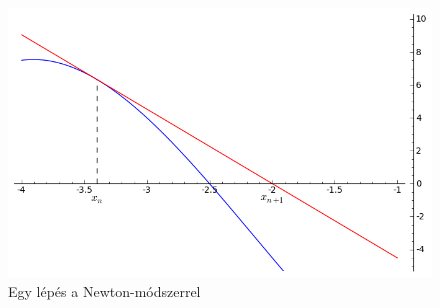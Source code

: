 \documentclass[a4paper,12pt]{report}
\begin{document}
			\begin{figure}[ht]
				\centering
				\includegraphics[scale=0.55]{kepek/kep1.png}
				\caption{Egy lépés a Newton-módszerrel}\label{k1}
			\end{figure}
\end{document}

